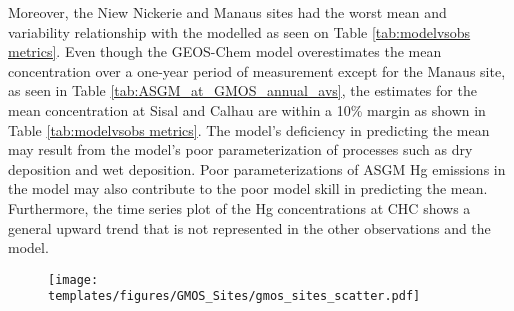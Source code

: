 \begin{flushleft}
Moreover, the Niew Nickerie and Manaus sites had the worst mean and variability relationship with the modelled \hg as seen on Table \ref{tab:modelvsobs metrics}. Even though the GEOS-Chem model overestimates the mean concentration over a one-year period of measurement except for the Manaus site, as seen in Table \ref{tab:ASGM_at_GMOS_annual_avs}, the estimates for the mean concentration at Sisal and Calhau are within a 10\% margin as shown in Table \ref{tab:modelvsobs metrics}. The model's deficiency in predicting the mean may result from the model's poor parameterization of processes such as dry deposition and wet deposition. Poor parameterizations of ASGM Hg emissions in the model may also  contribute to the poor model skill in predicting the mean. Furthermore, the time series plot of the Hg concentrations at CHC shows a general upward trend that is not represented in the other observations and the model. 
\end{flushleft}


\begin{flushleft}
  \begin{figure}[H]
\texttt{[image: templates/figures/GMOS\_Sites/gmos\_sites\_scatter.pdf]}
\centering
{}
\label{fig:GMOSvsGC}
\end{figure}
\FloatBarrier
\end{flushleft}

\begin{table}[H]
\label{tab:modelvsobs metrics}

\centering
{}

\end{table}
\begin{flushleft}
 
\end{flushleft}


